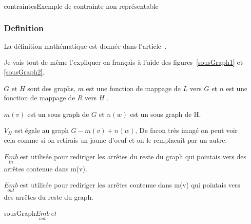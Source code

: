 \documentclass[a4paper, 12pt]{article}
\begin{document}
\begin{figu}{contraintes}{Exemple de contrainte non représentable}
\subsubsection{Definition}

La définition mathématique est donnée dans l'article~\cite[p.~15]{mainArticle}.

Je vais tout de même l'expliquer en français à l'aide des figures~\ref{sousGraph1} et \ref{sousGraph2}.

\(G\) et \(H\)  sont des graphs, \(m\) est une fonction de mappage de \(L\) vers \(G\) et \(n\) est une fonction de mappage de \(R\)  vers \(H\) .

\(m(v)\) est un sous graph de \(G\) et \(n(w)\) est un sous graph de H.

{$V_H$} est égale au graph \(G - m(v) + n(w)\), De facon très imagé on peut voir cela comme si on retirais un jaune d'oeuf et on le remplacait par un autre.

$\underset{in}{Emb}$ est utilisée pour rediriger les arrêtes du reste du graph qui pointais vers des arrêtes contenue dans m(v).

$\underset{out}{Emb}$ est utilisée pour rediriger les arrêtes contenue dans m(v) qui pointais vers des arrêtes du reste du graph.

\begin{myfig}{sousGraph}{$\underset{out}{Emb} ~ et ~ $}
\tikzset{>=latex}
\end{myfig}
\end{figu}
\end{document}
